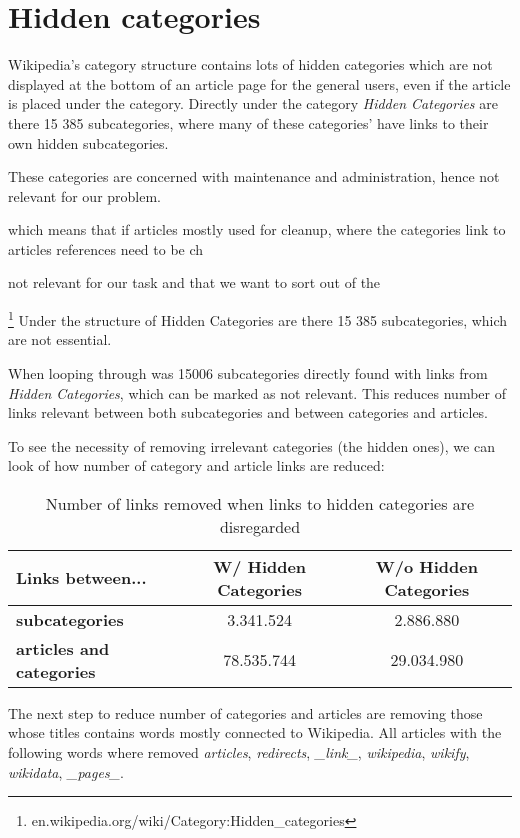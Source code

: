 \section{Hidden categories}
Wikipedia's category structure contains lots of hidden categories which are not displayed at the bottom of an article page for the general users, even if the article is placed under the category. Directly under the category \emph{Hidden Categories} are there 15 385 subcategories, where many of these categories' have links to their own hidden subcategories. 


These categories are concerned with maintenance and administration, hence not relevant for our problem. 

which means that if articles 
mostly used for cleanup, where the categories link to articles references need to be ch


not relevant for our task and that we want to sort out of the 

\footnote{en.wikipedia.org/wiki/Category:Hidden\_categories}
Under the structure of Hidden Categories are there 15 385 subcategories, which are not essential.

When looping through \enwikicatlink was 15006 subcategories directly found with links from \emph{Hidden Categories}, which can be marked as not relevant. This reduces number of links relevant between both subcategories and between categories and articles. 

To see the necessity of removing irrelevant categories (the hidden ones), we can look of how number of category and article links are reduced: 
\begin{table}[h]
\centering
\begin{tabular}{l|c|c}
 \textbf{Links between...} & \textbf{W/ Hidden Categories} & \textbf{W/o Hidden Categories}  \\ \hline
 \textbf{subcategories} & 3.341.524 & 2.886.880 \\
 \textbf{articles and categories} & 78.535.744 & 29.034.980 
\end{tabular}
\caption{Number of links removed when links to hidden categories are disregarded}
\label{tab:with_and_without_hidden_cats}
\end{table}

The next step to reduce number of categories and articles are removing those whose titles contains words mostly connected to Wikipedia. All articles with the following words where removed
\emph{articles}, \emph{redirects}, \emph{\_link\_}, \emph{wikipedia}, \emph{wikify}, \emph{wikidata}, \emph{\_pages\_}. 

